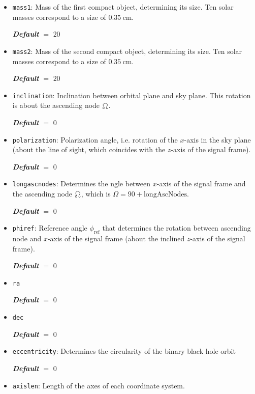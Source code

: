 \documentclass[
    DIV=11,
    BCOR=0mm,
    paper=a4,
    fontsize=11pt,
    twoside=false,
    titlepage=true
]{scrartcl}
\newcommand{\code}[1]{\textcolor{codecolor}{\texttt{#1}}}
\newcommand{\defaultval}[1]{%
    {\bfseries\slshape%
    Default} $=$ #1%
}
\begin{document}
\begin{itemize}
    \item \code{mass1}: Mass of the first compact object, determining its size. Ten solar masses correspond to a size of $\SI{0.35}{\centi\metre}$.

    \defaultval{$20$}


    \item \code{mass2}: Mass of the second compact object, determining its size. Ten solar masses correspond to a size of $\SI{0.35}{\centi\metre}$.

    \defaultval{$20$}


    \item \code{inclination}: Inclination between orbital plane and sky plane. This rotation is about the ascending node $\ascnode$.

    \defaultval{$0$}


    \item \code{polarization}: Polarization angle, i.e. rotation of the $x$-axis in the sky plane (about the line of sight, which coincides with the $z$-axis of the signal frame).

    \defaultval{$0$}


    \item \code{longascnodes}: Determines the ngle between $x$-axis of the signal frame and the ascending node $\ascnode$, which is $\Omega = 90 + \mathrm{longAscNodes}$.

    \defaultval{$0$}


    \item \code{phiref}: Reference angle $\phi_\mathrm{ref}$ that determines the rotation between ascending node and $x$-axis of the signal frame (about the inclined $z$-axis of the signal frame).

    \defaultval{$0$}


    \item \code{ra}

    \defaultval{$0$}


    \item \code{dec}

    \defaultval{$0$}


    \item \code{eccentricity}: Determines the circularity of the binary black hole orbit

    \defaultval{$0$}


    \item \code{axislen}: Length of the axes of each coordinate system.


\end{itemize}
\end{document}
